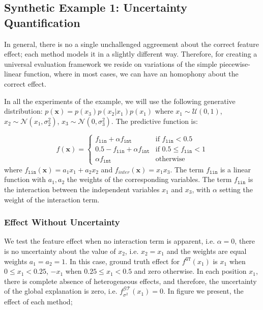 \documentclass[twoside]{article}
\begin{document}
\subsection{Synthetic Example 1: Uncertainty Quantification}

In general, there is no a single unchallenged aggreement about the
correct feature effect; each method models it in a slightly different
way. Therefore, for creating a universal evaluation framework we
reside on variations of the simple piecewise-linear function, where in
most cases, we can have an homophony about the correct effect.


In all the experiments of the example, we will use the following
generative distribution: \(p(\mathbf{x}) = p(x_3)p(x_2|x_1)p(x_1)\)
where \(x_1 \sim \mathcal{U}(0,1)\),
\(x_2 \sim \mathcal{N}(x_1, \sigma_2^2)\),
\(x_3 \sim \mathcal{N}(0, \sigma_3^2)\). 
%
The predictive function is:

\begin{equation}
  \label{eq:2}
  f(\mathbf{x}) = \begin{cases}
                    f_{\mathtt{lin}} + \alpha f_{\mathtt{int}} & \text{if $f_{\mathtt{lin}} < 0.5$ }\\
                    0.5 - f_{\mathtt{lin}} + \alpha f_{\mathtt{int}} & \text{if $0.5 \leq f_{\mathtt{lin}} < 1$}\\
                    \alpha f_{\mathtt{int}} &\text{otherwise}
                  \end{cases}
\end{equation}
%
where \(f_{\mathtt{lin}}(\mathbf{x}) = a_1 x_1 + a_2 x_2\) and
\(f_{inter}(\mathbf{x}) = x_1x_3\). The term \(f_{\mathtt{lin}}\) is a
linear function with \(a_1, a_2\) the weights of the corresponding
variables. The term \(f_{\mathtt{lin}}\) is the interaction between
the independent variables \(x_1\) and \(x_3\), with \(\alpha\) setting
the weight of the interaction term.

\subsubsection{Effect Without Uncertainty}

We test the feature effect when no interaction term is apparent,
i.e. \(\alpha=0\), there is no uncertainty about the value of \(x_2\),
i.e. \(x_2 = x_1\) and the weights are equal weights \(a_1=a_2=1\).
In this case, ground truth effect for \(f^{\mathtt{GT}}(x_1)\) is
\(x_1\) when \(0 \leq x_1 < 0.25\), \(-x_1\) when
\(0.25 \leq x_1 < 0.5\) and zero otherwise. In each position \(x_1\),
there is complete absence of heterogeneous effects, and therefore, the
uncertainty of the global explanation is zero,
i.e. \(f^{\mathcal{GT}}_{\sigma^2}(x_1) = 0\). In figure we present,
the effect of each method;
\end{document}
